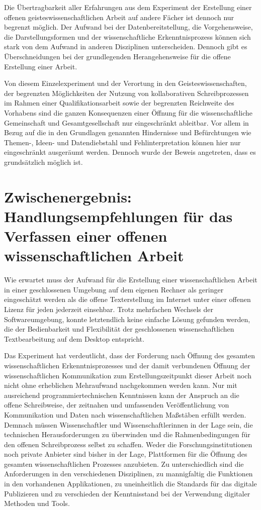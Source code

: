 Die Übertragbarkeit aller Erfahrungen aus dem Experiment der Erstellung einer offenen geisteswissenschaftlichen Arbeit auf andere Fächer ist dennoch nur begrenzt möglich. Der Aufwand bei der Datenbereitstellung, die Vorgehensweise, die Darstellungsformen und der wissenschaftliche Erkenntnisprozess können sich stark von dem Aufwand in anderen Disziplinen unterscheiden. Dennoch gibt es Überschneidungen bei der grundlegenden Herangehensweise für die offene Erstellung einer Arbeit.

Von diesem Einzelexperiment und der Verortung in den Geisteswissenschaften, der begrenzten Möglichkeiten der Nutzung von kollaborativen Schreibprozessen im Rahmen einer Qualifikationsarbeit sowie der begrenzten Reichweite des Vorhabens sind die ganzen Konsequenzen einer Öffnung für die wissenschaftliche Gemeinschaft und Gesamtgesellschaft nur eingeschränkt ableitbar. Vor allem in Bezug auf die in den Grundlagen genannten Hindernisse und Befürchtungen wie Themen-, Ideen- und Datendiebstahl und Fehlinterpretation können hier nur eingeschränkt ausgeräumt werden. Dennoch wurde der Beweis angetreten, dass es grundsätzlich möglich ist.

\section{Zwischenergebnis: Handlungsempfehlungen für das Verfassen einer offenen wissenschaftlichen Arbeit}

Wie erwartet muss der Aufwand für die Erstellung einer wissenschaftlichen Arbeit in einer geschlossenen Umgebung auf dem eigenen Rechner als geringer eingeschätzt werden als die offene Texterstellung im Internet unter einer offenen Lizenz für jeden jederzeit einsehbar. Trotz mehrfachen Wechsels der Softwareumgebung, konnte letztendlich keine einfache Lösung gefunden werden, die der Bedienbarkeit und Flexibilität der geschlossenen wissenschaftlichen Textbearbeitung auf dem Desktop entspricht.

Das Experiment hat verdeutlicht, dass der Forderung nach Öffnung des gesamten wissenschaftlichen Erkenntnisprozesses und der damit verbundenen Öffnung der wissenschaftlichen Kommunikation zum Erstellungszeitpunkt dieser Arbeit noch nicht ohne erheblichen Mehraufwand nachgekommen werden kann. Nur mit ausreichend programmiertechnischen Kenntnissen kann der Anspruch an die offene Schreibweise, der zeitnahen und umfassenden Veröffentlichung von Kommunikation und Daten nach wissenschaftlichen Maßstäben erfüllt werden. Demnach müssen Wissenschaftler und Wissenschaftlerinnen in der Lage sein, die technischen Herausforderungen zu überwinden und die Rahmenbedingungen für den offenen Schreibprozess selbst zu schaffen. Weder die Forschungsinstitutionen noch private Anbieter sind bisher in der Lage, Plattformen für die Öffnung des gesamten wissenschaftlichen Prozesses anzubieten. Zu unterschiedlich sind die Anforderungen in den verschiedenen Disziplinen, zu mannigfaltig die Funktionen in den vorhandenen Applikationen, zu uneinheitlich die Standards für das digitale Publizieren und zu verschieden der Kenntnisstand bei der Verwendung digitaler Methoden und Tools.

